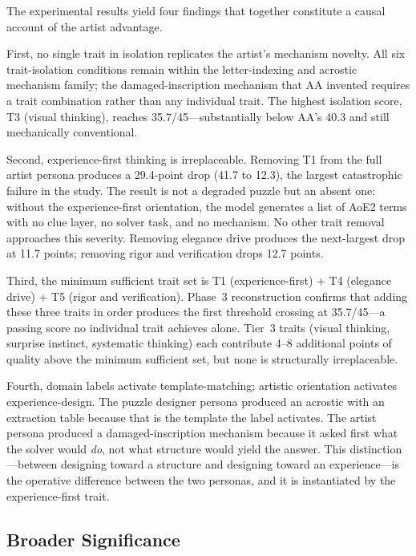 The experimental results yield four findings that together constitute a causal account of the artist advantage.

First, no single trait in isolation replicates the artist's mechanism novelty. All six trait-isolation conditions remain within the letter-indexing and acrostic mechanism family; the damaged-inscription mechanism that AA invented requires a trait combination rather than any individual trait. The highest isolation score, T3 (visual thinking), reaches 35.7/45---substantially below AA's 40.3 and still mechanically conventional.

Second, experience-first thinking is irreplaceable. Removing T1 from the full artist persona produces a 29.4-point drop (41.7 to 12.3), the largest catastrophic failure in the study. The result is not a degraded puzzle but an absent one: without the experience-first orientation, the model generates a list of AoE2 terms with no clue layer, no solver task, and no mechanism. No other trait removal approaches this severity. Removing elegance drive produces the next-largest drop at 11.7 points; removing rigor and verification drops 12.7 points.

Third, the minimum sufficient trait set is T1 (experience-first) + T4 (elegance drive) + T5 (rigor and verification). Phase~3 reconstruction confirms that adding these three traits in order produces the first threshold crossing at 35.7/45---a passing score no individual trait achieves alone. Tier~3 traits (visual thinking, surprise instinct, systematic thinking) each contribute 4--8 additional points of quality above the minimum sufficient set, but none is structurally irreplaceable.

Fourth, domain labels activate template-matching; artistic orientation activates experience-design. The puzzle designer persona produced an acrostic with an extraction table because that is the template the label activates. The artist persona produced a damaged-inscription mechanism because it asked first what the solver would \emph{do}, not what structure would yield the answer. This distinction---between designing toward a structure and designing toward an experience---is the operative difference between the two personas, and it is instantiated by the experience-first trait.

\subsection{Broader Significance}

